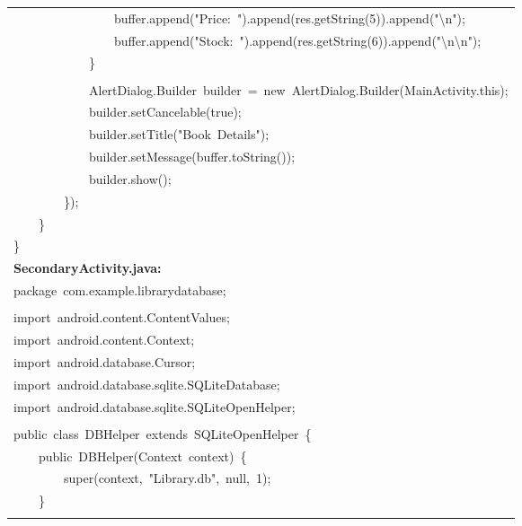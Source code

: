 \documentclass[a4paper,12pt]{article}
\begin{document}
\begin{longtable}{|p{}|}
{\ttfamily\small \ \ \ \ \ \ \ \ \ \ \ \ \ \ \ \ buffer.append("Price:\ ").append(res.getString(5)).append("\textbackslash{}n");} \\
{\ttfamily\small \ \ \ \ \ \ \ \ \ \ \ \ \ \ \ \ buffer.append("Stock:\ ").append(res.getString(6)).append("\textbackslash{}n\textbackslash{}n");} \\
{\ttfamily\small \ \ \ \ \ \ \ \ \ \ \ \ \}} \\
\strut \\
{\ttfamily\small \ \ \ \ \ \ \ \ \ \ \ \ AlertDialog.Builder\ builder\ =\ new\ AlertDialog.Builder(MainActivity.this);} \\
{\ttfamily\small \ \ \ \ \ \ \ \ \ \ \ \ builder.setCancelable(true);} \\
{\ttfamily\small \ \ \ \ \ \ \ \ \ \ \ \ builder.setTitle("Book\ Details");} \\
{\ttfamily\small \ \ \ \ \ \ \ \ \ \ \ \ builder.setMessage(buffer.toString());} \\
{\ttfamily\small \ \ \ \ \ \ \ \ \ \ \ \ builder.show();} \\
{\ttfamily\small \ \ \ \ \ \ \ \ \});} \\
{\ttfamily\small \ \ \ \ \}} \\
{\ttfamily\small \}} \\
\hline
\rule{0pt}{13pt}\textbf{SecondaryActivity.java:} \\
\hline
{\ttfamily\small package\ com.example.librarydatabase;} \\
\strut \\
{\ttfamily\small import\ android.content.ContentValues;} \\
{\ttfamily\small import\ android.content.Context;} \\
{\ttfamily\small import\ android.database.Cursor;} \\
{\ttfamily\small import\ android.database.sqlite.SQLiteDatabase;} \\
{\ttfamily\small import\ android.database.sqlite.SQLiteOpenHelper;} \\
\strut \\
{\ttfamily\small public\ class\ DBHelper\ extends\ SQLiteOpenHelper\ \{} \\
{\ttfamily\small \ \ \ \ public\ DBHelper(Context\ context)\ \{} \\
{\ttfamily\small \ \ \ \ \ \ \ \ super(context,\ "Library.db",\ null,\ 1);} \\
{\ttfamily\small \ \ \ \ \}} \\
\strut \\

\end{longtable}
\end{document}
